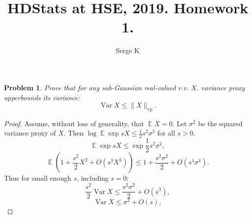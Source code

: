 \documentclass{article}
\title{HDStats at HSE, 2019. Homework 1.}
\author{Serge K}
\newtheorem{problem}{Problem}
\newcommand{\expect}{\operatorname{\mathbb{E}}}
\begin{document}
\maketitle

\begin{problem}
    Prove that
    for any sub-Gaussian real-valued r.v. \( X \).
    variance proxy upperbounds its variance:
    \[
        \operatorname{Var}X \leq \|X\|_{\mathrm{vp}}.
    \]
\end{problem}
\begin{proof}
    Assume, without loss of generality, that \( \expect X = 0\).
    Let \( \sigma^2 \) be the squared variance proxy of \( X \).
    Then \( \log \expect \exp sX \leq \frac12 s^2 \sigma^2 \)
    for all \( s > 0 \).
    \[
        \expect\exp sX \leq \exp \frac12 s^2 \sigma^2,
    \]
    \[
        \expect\left(1 + \frac{s^2}{2} X^2 + O(s^3X^3)\right)
        \leq 1 + \frac{s^2\sigma^2}{2} + O(s^4\sigma^4).
    \]
    Thus for small enough \( s \), including \( s=0 \):
    \[
        \frac{s^2}{2}\operatorname{Var}{X} \leq \frac{s^2\sigma^2}{2} + O(s^3),
    \]
    \[
        \operatorname{Var}{X} \leq \sigma^2 + O(s),
    \]
\end{proof}
\end{document}

